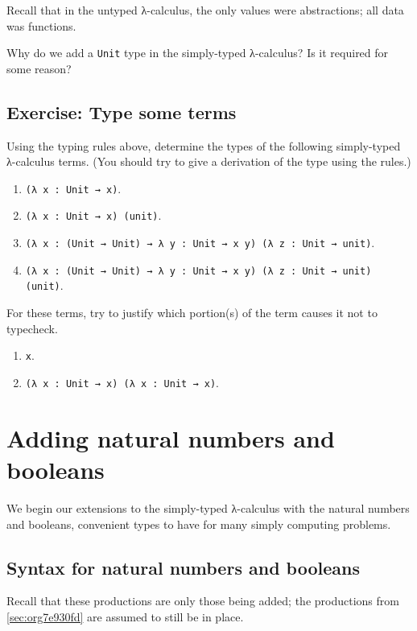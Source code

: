 \documentclass[11pt]{article}
\theoremstyle{definition}
\begin{document}
Recall that in the untyped λ-calculus,
the only values were abstractions; all data was functions.

Why do we add a \texttt{Unit} type in the simply-typed λ-calculus?
Is it required for some reason?

\subsection{Exercise: Type some terms}
\label{sec:org915a575}

Using the typing rules above, determine the types of the following
simply-typed λ-calculus terms.
(You should try to give a derivation of the type using the rules.)

\begin{enumerate}
\item \texttt{(λ x : Unit → x)}.
\item \texttt{(λ x : Unit → x) (unit)}.
\item \texttt{(λ x : (Unit → Unit) → λ y : Unit → x y) (λ z : Unit → unit)}.
\item \texttt{(λ x : (Unit → Unit) → λ y : Unit → x y) (λ z : Unit → unit) (unit)}.
\end{enumerate}

For these terms, try to justify which portion(s) of the term
causes it not to typecheck.
\begin{enumerate}
\item \texttt{x}.
\item \texttt{(λ x : Unit → x) (λ x : Unit → x)}.
\end{enumerate}

\section{Adding natural numbers and booleans}
\label{sec:org59c1ee8}

We begin our extensions to the simply-typed λ-calculus
with the natural numbers and booleans,
convenient types to have for many simply computing problems.

\subsection{Syntax for natural numbers and booleans}
\label{sec:org302b64e}

Recall that these productions are only those being added;
the productions from \ref{sec:org7e930fd} are
assumed to still be in place.
\end{document}
